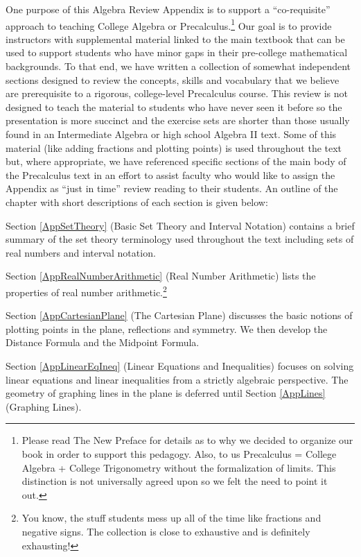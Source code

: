 One purpose of this Algebra Review Appendix is to support a ``co-requisite'' approach to teaching College Algebra or Precalculus.\footnote{Please read The New Preface for details as to why we decided to organize our book in order to support this pedagogy. Also, to us Precalculus = College Algebra + College Trigonometry without the formalization of limits.  This distinction is not universally agreed upon so we felt the need to point it out.}  Our goal is to provide instructors with supplemental material linked to the main textbook that can be used to support students who have minor gaps in their pre-college mathematical backgrounds.  To that end, we have written a collection of somewhat independent sections designed to review the concepts, skills and vocabulary that we believe are prerequisite to a rigorous, college-level Precalculus course.  This review is not designed to teach the material to students who have never seen it before so the presentation is more succinct and the exercise sets are shorter than those usually found in an Intermediate Algebra or high school Algebra II text.  Some of this material (like adding fractions and plotting points) is used throughout the text but, where appropriate, we have referenced specific sections of the main body of the Precalculus text in an effort to assist faculty who would like to assign the Appendix as ``just in time'' review reading to their students.  An outline of the chapter with short descriptions of each section is given below:

\medskip

Section \ref{AppSetTheory} (Basic Set Theory and Interval Notation) contains a brief summary of the set theory terminology used throughout the text including sets of real numbers and interval notation.

\medskip

Section \ref{AppRealNumberArithmetic} (Real Number Arithmetic) lists the properties of real number arithmetic.\footnote{You know, the stuff students mess up all of the time like fractions and negative signs.  The collection is close to exhaustive and is definitely exhausting!}

\medskip

Section \ref{AppCartesianPlane} (The Cartesian Plane) discusses the basic notions of plotting points in the plane, reflections and symmetry.  We then develop the Distance Formula and the Midpoint Formula.

\medskip

Section \ref{AppLinearEqIneq} (Linear Equations and Inequalities) focuses on solving linear equations and linear inequalities from a strictly algebraic perspective.  The geometry of graphing lines in the plane is deferred until Section \ref{AppLines} (Graphing Lines).

